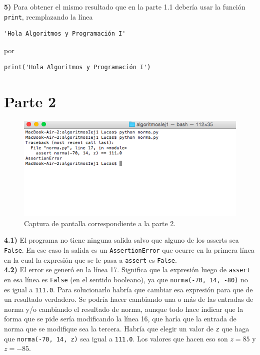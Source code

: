 \documentclass{article}
\begin{document}
\textbf{5)} Para obtener el mismo resultado que en la parte 1.1 deber\'ia usar la funci\'on \texttt{print}, reemplazando la l\'inea
\begin{verbatim}
'Hola Algoritmos y Programación I'
\end{verbatim}
por
\begin{verbatim}
print('Hola Algoritmos y Programación I')
\end{verbatim}

\section*{Parte 2}
\begin{figure}[H]
    \centering
    \includegraphics[width=1\textwidth]{parte-2.png}
    \caption{Captura de pantalla correspondiente a la parte 2.}
    \label{fig:captura-2}
\end{figure}

\textbf{4.1)} El programa no tiene ninguna salida salvo que alguno de los asserts sea \texttt{False}. En ese caso la salida es un \texttt{AssertionError} que ocurre en la primera l\'inea en la cual la expresi\'on que se le pasa a \texttt{assert} es \texttt{False}.\\

\noindent
\textbf{4.2)} El error se gener\'o en la l\'inea 17. Significa que la expresi\'on luego de \texttt{assert} en esa l\'inea es \texttt{False} (en el sentido booleano), ya que \texttt{norma(-70, 14, -80)} no es igual a \texttt{111.0}. Para solucionarlo habr\'ia que cambiar esa expresi\'on para que de un resultado verdadero. Se podr\'ia hacer cambiando una o m\'as de las entradas de norma y/o cambiando el resultado de norma, aunque todo hace indicar que la forma que se pide ser\'ia modificando la l\'inea 16, que har\'ia que la entrada de norma que se modifique sea la tercera. Habr\'ia que elegir un valor de \texttt{z} que haga que \texttt{norma(-70, 14, z)} sea igual a \texttt{111.0}. Los valores que hacen eso son $z = 85$ y $z = -85$.\\
\end{document}
